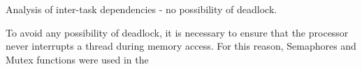 \documentclass[main.tex]{subfiles}
\begin{document}
Analysis of inter-task dependencies - no possibility of deadlock.

To avoid any possibility of deadlock, it is necessary to ensure that the processor never interrupts a thread during memory access. For this reason, Semaphores and Mutex functions were used in the 
\end{document}
